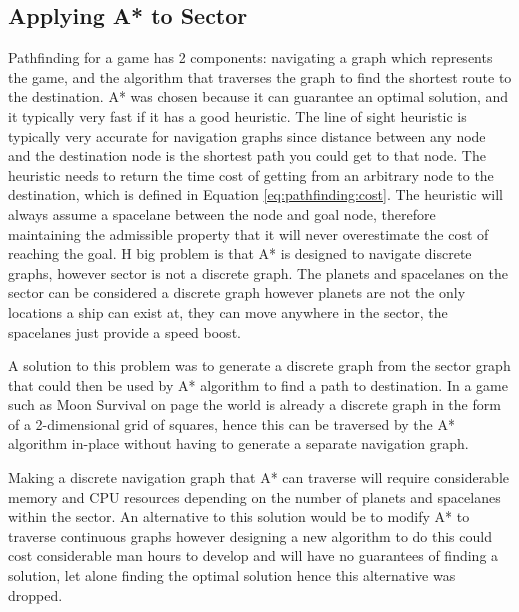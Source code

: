 \subsection{Applying A* to Sector}
Pathfinding for a game has 2 components: navigating a graph which represents the game, and the algorithm that traverses the graph to find the shortest route to the destination.
A* was chosen because it can guarantee an optimal solution, and it typically very fast if it has a good heuristic. 
The line of sight heuristic is typically very accurate for navigation graphs since distance between any node and the destination node is the shortest path you could get to that node.
The heuristic needs to return the time cost of getting from an arbitrary node to the destination, which is defined in Equation \ref{eq:pathfinding:cost}.
The heuristic will always assume a spacelane between the node and goal node, therefore maintaining the admissible property that it will never overestimate the cost of reaching the goal.
H big problem is that A* is designed to navigate discrete graphs, however sector is not a discrete graph.
The planets and spacelanes on the sector can be considered a discrete graph however planets are not the only locations a ship can exist at, they can move anywhere in the sector, the spacelanes just provide a speed boost.

A solution to this problem was to generate a discrete graph from the sector graph that could then be used by A* algorithm to find a path to destination. 
In a game such as Moon Survival on page \pageref{sec:rd:moonSurvival} the world is already a discrete graph in the form of a 2-dimensional grid of squares, hence this can be traversed by the A* algorithm in-place without having to generate a separate navigation graph.

Making a discrete navigation graph that A* can traverse will require considerable memory and CPU resources depending on the number of planets and spacelanes within the sector.
An alternative to this solution would be to modify A* to traverse continuous graphs however designing a new algorithm to do this could cost considerable man hours to develop and will have no guarantees of finding a solution, let alone finding the optimal solution hence this alternative was dropped.


